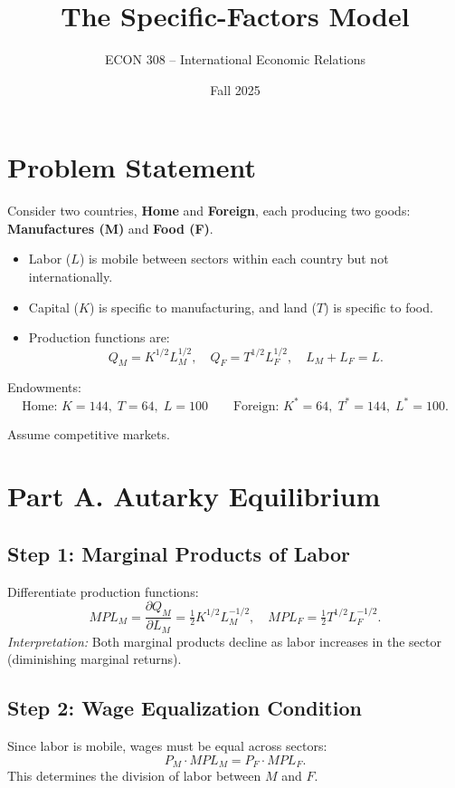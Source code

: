 \documentclass[12pt]{article}
\title{The Specific-Factors Model}
\author{ECON 308 -- International Economic Relations}
\date{Fall 2025}
\begin{document}
\maketitle

\section*{Problem Statement}

Consider two countries, \textbf{Home} and \textbf{Foreign}, each producing two goods: \textbf{Manufactures (M)} and \textbf{Food (F)}. 

\begin{itemize}
\item Labor ($L$) is mobile between sectors within each country but not internationally.
\item Capital ($K$) is specific to manufacturing, and land ($T$) is specific to food.
\item Production functions are:
\[
Q_M = K^{1/2} L_M^{1/2}, 
\quad 
Q_F = T^{1/2} L_F^{1/2}, 
\quad 
L_M + L_F = L.
\]
\end{itemize}

Endowments:
\[
\text{Home: } K=144,\; T=64,\; L=100 
\quad \quad 
\text{Foreign: } K^{*}=64,\; T^{*}=144,\; L^{*}=100.
\]

Assume competitive markets.

\bigskip

\section*{Part A. Autarky Equilibrium}

\subsection*{Step 1: Marginal Products of Labor}
Differentiate production functions:
\[
MPL_M = \frac{\partial Q_M}{\partial L_M} = \tfrac12 K^{1/2} L_M^{-1/2}, 
\quad 
MPL_F = \tfrac12 T^{1/2} L_F^{-1/2}.
\]
\textit{Interpretation:} Both marginal products decline as labor increases in the sector (diminishing marginal returns). 

\subsection*{Step 2: Wage Equalization Condition}
Since labor is mobile, wages must be equal across sectors:
\[
P_M \cdot MPL_M = P_F \cdot MPL_F.
\]
This determines the division of labor between $M$ and $F$.
\end{document}

